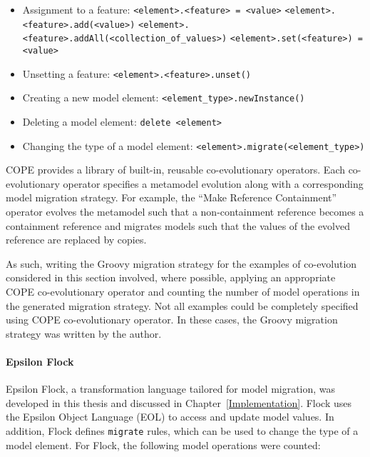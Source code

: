 \begin{itemize}
	\item Assignment to a feature:
	\subitem \texttt{<element>.<feature> = <value>}
	\subitem \texttt{<element>.<feature>.add(<value>)}
	\subitem \texttt{<element>.<feature>.addAll(<collection\_of\_values>)}
	\subitem \texttt{<element>.set(<feature>) = <value>}
	
	\item Unsetting a feature:
	\subitem \texttt{<element>.<feature>.unset()}	
	
	\item Creating a new model element:
	\subitem \texttt{<element\_type>.newInstance()}
	
	\item Deleting a model element:
	\subitem \texttt{delete <element>}
	
	\item Changing the type of a model element:
	\subitem \texttt{<element>.migrate(<element\_type>)}
\end{itemize}

COPE provides a library of built-in, reusable co-evolutionary operators. Each co-evolutionary operator specifies a metamodel evolution along with a corresponding model migration strategy. For example, the ``Make Reference Containment'' operator evolves the metamodel such that a non-containment reference becomes a containment reference and migrates models such that the values of the evolved reference are replaced by copies.

As such, writing the Groovy migration strategy for the examples of co-evolution considered in this section involved, where possible, applying an appropriate COPE co-evolutionary operator and counting the number of model operations in the generated migration strategy. Not all examples could be completely specified using COPE co-evolutionary operator. In these cases, the Groovy migration strategy was written by the author.


\paragraph{Epsilon Flock}
Epsilon Flock, a transformation language tailored for model migration, was developed in this thesis and discussed in Chapter~\ref{Implementation}. Flock uses the Epsilon Object Language (EOL) \cite{kolovos06eol} to access and update model values. In addition, Flock defines \texttt{migrate} rules, which can be used to change the type of a model element. For Flock, the following model operations were counted:

